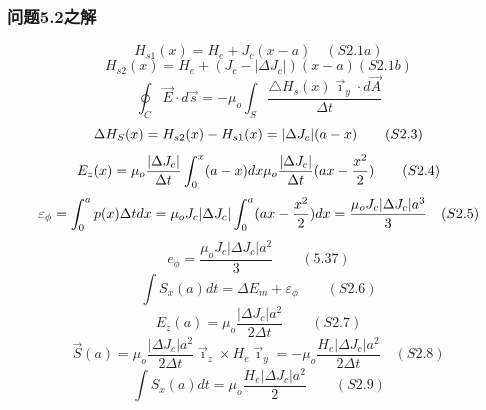 \subsubsection{问题5.2之解}

\begin{equation}%
H_{s1}(x)=H_{e}+J_{c}(x-a)\quad(S2.1a)
\end{equation}
\begin{equation}%
H_{s2}(x)=H_{e}+(J_{c}-| \Delta J_{c}|)(x-a)(S2.1b)
\end{equation}
\begin{equation}%
\oint_{C}\vec{E}\cdot d\vec{s}=-\mu_{o}\int_{S}\frac{\triangle H_{s}(x)\vec{\imath}_{y}\cdot d\vec{A}}{\Delta t}
\end{equation}
\begin{equation}%
\Delta H_{S}(x)=H_{s2}(x)-H_{s1}(x)\\
=|\Delta J_{c}|(a-x)\qquad(S2.3)
\end{equation}
\begin{equation}%
E_{z}(x)=\mu_{o}\frac{|\Delta J_{c}|}{\Delta t}\int_{0}^{x}(a-x)dx\\
\mu_{o}\frac{|\Delta J_{c}|}{\Delta t}(ax-\frac{x^{2}}{2})\qquad(S2.4)
\end{equation}
\begin{equation}%
\varepsilon_{\phi}=\int_{0}^{a}p(x)\Delta tdx\\
=\mu_{o}J_{c}|\Delta J_{c}|\int_{0}^{a}(ax-\frac{x^{2}}{2})dx=\frac{\mu_{o}J_{c}|\Delta J_{c}|a^{3}}{3}\quad(S2.5)
\end{equation}
\begin{equation}%
e_{\phi}=\frac{\mu_{o}J_{c}|\Delta J_{c}|a^{2}}{3}\qquad(5.37)
\end{equation}
\begin{equation}%
\int S_{x}(a)dt=\Delta E_{m}+\varepsilon_{\phi}\qquad(S2.6)
\end{equation}
\begin{equation}%
E_{z}(a)=\mu_{o}\frac{|\Delta J_{c}|a^{2}}{2\Delta t}\qquad(S2.7)
\end{equation}
\begin{equation}%
\vec{S}(a)=\mu_{o}\frac{|\Delta J_{c}|a^{2}}{2\Delta t}\vec{\imath}_{z}\times H_{e}\vec{\imath}_{y}=-\mu_{o}\frac{H_{e}|\Delta J_{c}|a^{2}}{2\Delta t}\quad(S2.8)
\end{equation}
\begin{equation}%
\int S_{x}(a)dt=\mu_{o}\frac{H_{e}|\Delta J_{c}|a^{2}}{2}\qquad(S2.9)
\end{equation}
